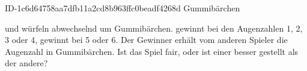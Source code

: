 \begin{exercise}
      {ID-1c6d64758aa7dfb11a2cd8b963ffc0beadf4268d}
      {Gummibärchen}
  \ifproblem\problem\par
    \xya{} und \xxb{} würfeln abwechselnd um Gummibärchen. \xya{} gewinnt bei den
    Augenzahlen 1, 2, 3 oder 4, \xxb{} gewinnt bei 5 oder 6. Der Gewinner
    erhält vom anderen Spieler die Augenzahl in Gummibärchen. Ist das Spiel
    fair, oder ist einer besser gestellt als der andere?
  \fi
\end{exercise}

